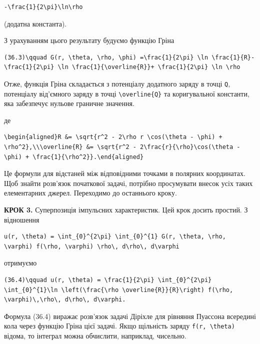 \documentclass[
  ukrainian,
]{article}
\begin{document}
\begin{verbatim}
-\frac{1}{2\pi}\ln\rho
\end{verbatim}

(додатна константа).

З урахуванням цього результату будуємо функцію Гріна

\begin{verbatim}
(36.3)\qquad G(r, \theta, \rho, \phi) =\frac{1}{2\pi} \ln \frac{1}{R}- \frac{1}{2\pi} \ln \frac{1}{\overline{R}}+ \frac{1}{2\pi} \ln \rho
\end{verbatim}

Отже, функція Гріна складається з потенціалу додатного заряду в точці
\texttt{Q}, потенціалу від'ємного заряду в точці
\texttt{\textbackslash{}overline\{Q\}} та коригувальної константи, яка
забезпечує нульове граничне значення.

де

\begin{verbatim}
\begin{aligned}R &= \sqrt{r^2 - 2\rho r \cos(\theta - \phi) + \rho^2},\\\overline{R} &= \sqrt{r^2 - 2\frac{r}{\rho}\cos(\theta - \phi) + \frac{1}{\rho^2}}.\end{aligned}
\end{verbatim}

Це формули для відстаней між відповідними точками в полярних
координатах. Щоб знайти розв'язок початкової задачі, потрібно
просумувати внесок усіх таких елементарних джерел. Переходимо до
останнього кроку.

\textbf{КРОК 3.} Суперпозиція імпульсних характеристик. Цей крок досить
простий. З відношення

\begin{verbatim}
u(r, \theta) = \int_{0}^{2\pi} \int_{0}^{1} G(r, \theta, \rho, \varphi) f(\rho, \varphi) \rho\, d\rho\, d\varphi
\end{verbatim}

отримуємо

\begin{verbatim}
(36.4)\qquad u(r, \theta) = \frac{1}{2\pi} \int_{0}^{2\pi} \int_{0}^{1}\ln \left(\frac{\rho \overline{R}}{R}\right) f(\rho, \varphi)\,\rho\, d\rho\, d\varphi.
\end{verbatim}

Формула (36.4) виражає розв'язок задачі Діріхле для рівняння Пуассона
всередині кола через функцію Гріна цієї задачі. Якщо щільність заряду
\texttt{f(r,\ \textbackslash{}theta)} відома, то інтеграл можна
обчислити, наприклад, чисельно.
\end{document}
